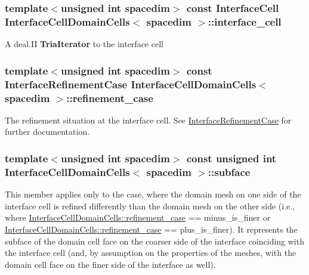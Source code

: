 \subsubsection[{\texorpdfstring{interface\+\_\+cell}{interface_cell}}]{\setlength{\rightskip}{0pt plus 5cm}template$<$unsigned int spacedim$>$ const {\bf Interface\+Cell} {\bf Interface\+Cell\+Domain\+Cells}$<$ spacedim $>$\+::interface\+\_\+cell}\hypertarget{class_interface_cell_domain_cells_acabc5a62be3f7742c3c334ae1777fbd5}{}\label{class_interface_cell_domain_cells_acabc5a62be3f7742c3c334ae1777fbd5}
A deal.\+II {\bf Tria\+Iterator} to the interface cell 
\subsubsection[{\texorpdfstring{refinement\+\_\+case}{refinement_case}}]{\setlength{\rightskip}{0pt plus 5cm}template$<$unsigned int spacedim$>$ const {\bf Interface\+Refinement\+Case} {\bf Interface\+Cell\+Domain\+Cells}$<$ spacedim $>$\+::refinement\+\_\+case}\hypertarget{class_interface_cell_domain_cells_ab1b5469ca5c40256942ea179abbba92c}{}\label{class_interface_cell_domain_cells_ab1b5469ca5c40256942ea179abbba92c}
The refinement situation at the interface cell. See \hyperlink{triangulation__system_8h_a4cfb8c5e21535951e919b6a6b1023af7}{Interface\+Refinement\+Case} for further documentation. 
\subsubsection[{\texorpdfstring{subface}{subface}}]{\setlength{\rightskip}{0pt plus 5cm}template$<$unsigned int spacedim$>$ const unsigned int {\bf Interface\+Cell\+Domain\+Cells}$<$ spacedim $>$\+::subface}\hypertarget{class_interface_cell_domain_cells_aba7f3e048c6985006988d716cb31aa7d}{}\label{class_interface_cell_domain_cells_aba7f3e048c6985006988d716cb31aa7d}
This member applies only to the case, where the domain mesh on one side of the interface cell is refined differently than the domain mesh on the other side (i.\+e., where \hyperlink{class_interface_cell_domain_cells_ab1b5469ca5c40256942ea179abbba92c}{Interface\+Cell\+Domain\+Cells\+::refinement\+\_\+case} == {\ttfamily minus\+\_\+is\+\_\+finer} or \hyperlink{class_interface_cell_domain_cells_ab1b5469ca5c40256942ea179abbba92c}{Interface\+Cell\+Domain\+Cells\+::refinement\+\_\+case} == {\ttfamily plus\+\_\+is\+\_\+finer}). It represents the subface of the domain cell face on the coarser side of the interface coinciding with the interface cell (and, by assumption on the properties of the meshes, with the domain cell face on the finer side of the interface as well).

